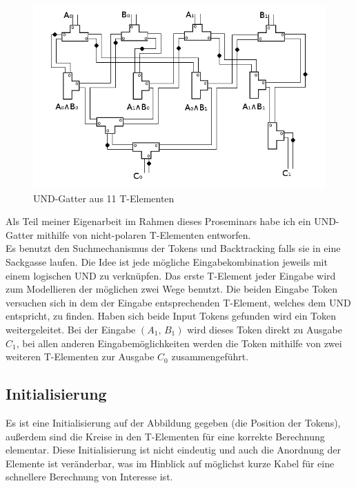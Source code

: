 \documentclass[11pt,a4paper]{article}
\begin{document}
\begin{figure}[h]
    \centering
    \includegraphics[width=12cm]{bilder/UndUnd.png}
    \caption{UND-Gatter aus 11 T-Elementen}
\end{figure}    

Als Teil meiner Eigenarbeit im Rahmen dieses Proseminars habe ich ein UND-Gatter
mithilfe von nicht-polaren T-Elementen entworfen. \\
%
Es benutzt den Suchmechanismus der Tokens und Backtracking falls sie in eine 
Sackgasse laufen. 
%
Die Idee ist jede mögliche Eingabekombination jeweils mit einem 
logischen UND zu verknüpfen. 
%
Das erste T-Element jeder Eingabe wird zum Modellieren
der möglichen zwei Wege benutzt.
%
Die beiden Eingabe Token versuchen sich in dem der Eingabe entsprechenden
T-Element, welches dem UND entspricht, zu finden.
%
Haben sich beide Input Tokens gefunden wird ein Token weitergeleitet.
Bei der Eingabe $ (A_{1},\, B_{1}) $ wird dieses Token direkt zu Ausgabe
$ C_{1} $, bei allen anderen Eingabemöglichkeiten werden die Token mithilfe
von zwei weiteren T-Elementen zur Ausgabe $ C_{0} $ zusammengeführt. 


\subsection{Initialisierung}
Es ist eine Initialisierung auf der Abbildung gegeben (die Position der Tokens), 
außerdem sind die Kreise in den T-Elementen für eine korrekte Berechnung
elementar.
%
Diese Initialisierung ist nicht eindeutig und auch die Anordnung der
Elemente ist veränderbar, was im Hinblick auf möglichst kurze Kabel 
für eine schnellere Berechnung von Interesse ist.
\end{document}
